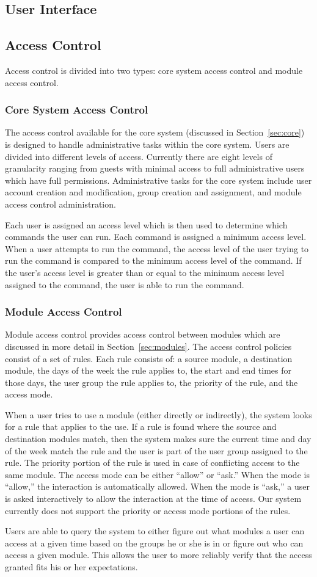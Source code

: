 \subsection{User Interface}
\label{sec:interface}
\subsection{Access Control}
\label{sec:access}
Access control is divided into two types: core system access control and module
access control.
\subsubsection{Core System Access Control}
The access control available for the core system (discussed in
Section~\ref{sec:core}) is designed to handle administrative tasks within the
core system. Users are divided into different levels of access. Currently there
are eight levels of granularity ranging from guests with minimal access to
full administrative users which have full permissions. Administrative tasks for
the core system include user account creation and modification, group creation
and assignment, and module access control administration.

Each user is assigned an access level which is then used to determine which
commands the user can run. Each command is assigned a minimum access level.
When a user attempts to run the command, the access level of the user trying to
run the command is compared to the minimum access level of the command. If the
user's access level is greater than or equal to the minimum access level
assigned to the command, the user is able to run the command.
\subsubsection{Module Access Control}
Module access control provides access control between modules which are
discussed in more detail in Section~\ref{sec:modules}. The access control
policies consist of a set of rules. Each rule consists of: a source module, a
destination module, the days of the week the rule applies to, the start and end
times for those days, the user group the rule applies to, the priority of the
rule, and the access mode.

When a user tries to use a module (either directly or indirectly), the system
looks for a rule that applies to the use. If a rule is found where the source
and destination modules match, then the system makes sure the current time and
day of the week match the rule and the user is part of the user group assigned
to the rule. The priority portion of the rule is used in case of conflicting
access to the same module. The access mode can be either ``allow'' or ``ask.''
When the mode is ``allow,'' the interaction is automatically allowed. When the
mode is ``ask,'' a user is asked interactively to allow the interaction at the
time of access. Our system currently does not support the priority or access
mode portions of the rules.

Users are able to query the system to either figure out what modules a user can
access at a given time based on the groups he or she is in or figure out who can
access a given module. This allows the user to more reliably verify that the
access granted fits his or her expectations.
